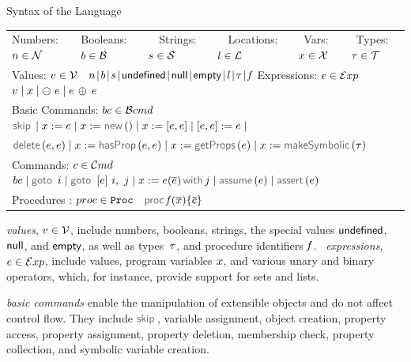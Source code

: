 \vspace{5pt}
\begin{display}{Syntax of the \jsil Language}{
\begin{tabular}{llllll}
	 Numbers: $n \in \mathcal{N}$ &  Booleans: $b \in \mathcal{B}$ & \  \ Strings: $s \in {\mathcal S}$ & \  \ Locations: $l \in {\mathcal L}$ & \  Vars: $x \in \mathcal{X}$ & \ Types: $\tau \in \mathcal{T}$ \\[0.1cm]
\multicolumn{6}{l}{Values: $v \in \mathcal{V}$  \ $\jnumber \! \mid \! \jbool \! \mid \! \jstring \! \mid \! \jundefined \! \mid \! \jnull \! \mid \! \jempty \! \mid \! \loc \! \mid \! \jtype \! \mid \!  \pid$ \qquad Expressions: $e \in \mathcal{E}xp$  \ $v \mid x \mid \ominus\ e \mid e \, \oplus_{} \, e $} \\[0.1cm]
	\multicolumn{6}{l}{Basic Commands: $bc \in \mathcal{B}cmd$ \ $\jsilskip \mid \jvar := \jsilexpr  \mid \jvar := \jsilnew() \mid \jvar := [\jsilexpr, \jsilexpr] \mid [\jsilexpr, \jsilexpr] := \jsilexpr \mid$} \\[0.1cm]
	\multicolumn{6}{l}{\hspace{3.29cm} $\jsildelete(\jsilexpr, \jsilexpr) \mid \jvar := \hasfield(\jsilexpr, \jsilexpr) \mid \jvar := \getfields(\jsilexpr) \mid \jvar := \makesymbolic(\jtype)$} \\[0.1cm]
	\multicolumn{6}{l}{Commands: $c \in \mathcal{C}md$  \ $ \bcmd \mid \goto \ i \mid  \ifgoto{\jsilexpr}{i}{j} \mid \jsilcall{\jvar}{\jsilexpr}{\jvec{\jsilexpr}}{j} 
	         \mid \assume(\jsilexpr) \mid \assert(\jsilexpr)$} \\[0.1cm]
	\multicolumn{6}{l}{Procedures : $proc \in \mathtt{Proc}$  \ $\procedure{\pid}{\jvec{\jvar}}{\jvec{\jcmd}}$}
 \end{tabular}}
\end{display}

\vspace{5pt}
\noindent \jsil \emph{values}, $v \in \mathcal{V}$, include numbers, booleans, strings, the special values ${\sf undefined}$, ${\sf null}$, and ${\sf empty}$, as well as types~$\tau$, and procedure identifiers $\mathit{f}$.
\jsil~\emph{expressions}, $e \in \mathcal{E}xp$, include \jsil values, \jsil program variables $x$, and various unary and binary operators, which, for instance, provide support for sets and lists. 

\jsil \emph{basic commands} enable the manipulation of extensible objects and do not affect control flow. 
They include $\jsilskip$, variable assignment, object creation, property access, property assignment, property deletion, membership check,  property collection, and symbolic variable creation. 

